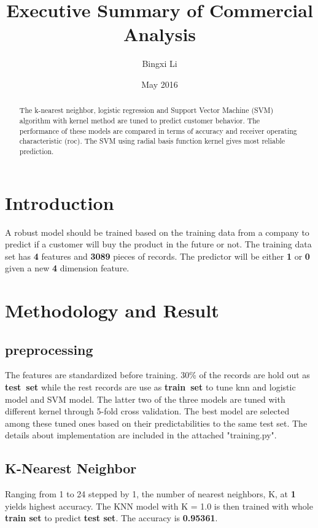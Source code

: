 \documentclass{article}
\title{\Large{Executive Summary of Commercial Analysis}\vspace{-0.5cm}}
\author{Bingxi Li}
\date{\vspace{-2ex}May 2016}
\begin{document}
\begin{singlespacing}

\maketitle
\begin{abstract}
The k-nearest neighbor, logistic regression and Support Vector Machine (SVM) algorithm with kernel method are tuned to predict customer behavior. The performance of these models are compared in terms of accuracy and receiver operating characteristic (roc). The SVM using radial basis function kernel gives most reliable prediction. 
\end{abstract}

\section{Introduction}
A robust model should be trained based on the training data from a company to predict if a customer will buy the product in the future or not. The training data set has \textbf{4} features and \textbf{3089} pieces of records. The predictor will be either \textbf{1} or \textbf{0} given a new \textbf{4} dimension feature.

\section{Methodology and Result}
\subsection{preprocessing}
The features are standardized before training. 30\% of the records are hold out as \textbf{test\ set} while the rest records are use as \textbf{train\ set} to tune knn and logistic model and SVM model. The latter two of the three models are tuned with different kernel through 5-fold cross validation. The best model are selected among these tuned ones based on their predictabilities to the same test set. The details about implementation are included in the attached "training.py".

\subsection{K-Nearest Neighbor}
Ranging from 1 to 24 stepped by 1, the number of nearest neighbors, K, at \textbf{1} yields highest accuracy. The KNN model with K = 1.0 is then trained with whole \textbf{train set} to predict \textbf{test set}. The accuracy is \textbf{0.95361}.


\end{singlespacing}
\end{document}
